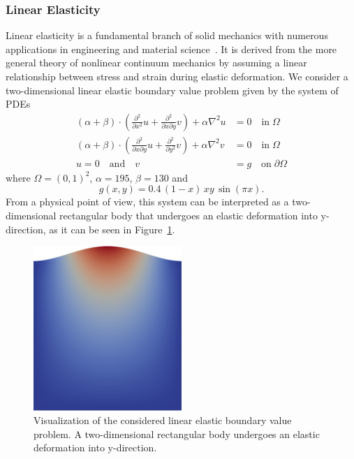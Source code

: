 \subsubsection{Linear Elasticity}
Linear elasticity is a fundamental branch of solid mechanics with numerous applications in engineering and material science~\cite{holzapfel2001nonlinear}.
It is derived from the more general theory of nonlinear continuum mechanics by assuming a linear relationship between stress and strain during elastic deformation.
We consider a two-dimensional linear elastic boundary value problem given by the system of PDEs
\begin{equation}
	\begin{split}
		(\alpha + \beta) \cdot (\frac{\partial^2}{\partial x^2} u + \frac{\partial^2}{\partial x \partial y} v) + \alpha \nabla^2 u & = 0 \quad \text{in} \; \Omega \\
		(\alpha + \beta) \cdot (\frac{\partial^2}{\partial x \partial y} u + \frac{\partial^2}{\partial y^2} v) + \alpha \nabla^2 v & = 0 \quad \text{in} \; \Omega \\
		u = 0 \quad \text{and} \quad v & = g \quad \text{on} \; \partial \Omega 
		\label{eq:linear-elasticity}
	\end{split}
\end{equation}
where $\Omega = (0,1)^2$, $\alpha = 195$, $\beta = 130$ and
\begin{equation*}
	g(x,y) = 0.4 \, (1 - x) \, x y \, \sin(\pi x).
\end{equation*}
From a physical point of view, this system can be interpreted as a two-dimensional rectangular body that undergoes an elastic deformation into y-direction, as it can be seen in Figure~\ref{fig:visualization-linear-elasticity}.
\begin{figure}
	\centering
	\includegraphics[width=0.5\textwidth]{figures/visualization-linear-elasticity1}
	\caption{Visualization of the considered linear elastic boundary value problem. A two-dimensional rectangular body undergoes an elastic deformation into y-direction.}
	\label{fig:visualization-linear-elasticity}
\end{figure}
